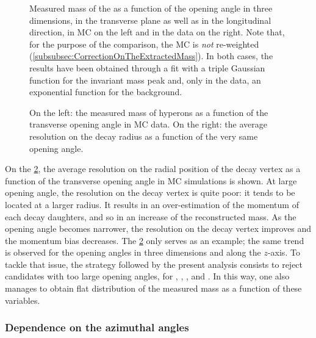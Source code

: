 \begin{figure}[!p]
{	\label{fig:MassVsOpeningAngleZLambda}
} 
\caption{Measured mass of the \rmLambda as a function of the opening angle in three dimensions, in the transverse plane as well as in the longitudinal direction, in MC on the left and in the data on the right. Note that, for the purpose of the comparison, the MC is \textit{not} re-weighted (\Sec\ref{subsubsec:CorrectionOnTheExtractedMass}). In both cases, the results have been obtained through a fit with a triple Gaussian function for the invariant mass peak and, only in the data, an exponential function for the background.}
	\label{fig:MassVsOpeningAngleLambda}
\end{figure}

\begin{figure}[h]
\hspace*{-2.cm}
\caption{On the left: the measured mass of \rmLambda hyperons as a function of the transverse opening angle in MC data. On the right: the average resolution on the decay radius as a function of the very same opening angle.}
	\label{fig:MassVsOpeningAngle}
\end{figure}

On the \fig\ref{fig:MassVsOpeningAngle}, the average resolution on the radial position of the decay vertex as a function of the transverse opening angle in MC simulations is shown. At large opening angle, the resolution on the decay vertex is quite poor: it tends to be located at a larger radius. It results in an over-estimation of the momentum of each decay daughters, and so in an increase of the reconstructed mass. As the opening angle becomes narrower, the resolution on the decay vertex improves and the momentum bias decreases. The \fig\ref{fig:MassVsOpeningAngle} only serves as an example; the same trend is observed for the opening angles in three dimensions and along the $z$-axis. To tackle that issue, the strategy followed by the present analysis consists to reject candidates with too large opening angles, for \rmKzeroS, \rmLambda, \rmAlambda, \rmXiPM and \rmOmegaPM. In this way, one also manages to obtain flat distribution of the measured mass as a function of these variables.

\subsubsection{Dependence on the azimuthal angles}
\label{subsubsec:DependenceAzimuthalAngle}

